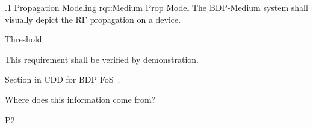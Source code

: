 \ONERQMTVKSA
{\RqtNumberBase.1}
{Propagation Modeling}
{rqt:Medium Prop Model}
{The BDP-Medium system shall visually depict the RF propagation on a device.}
{
	\item [Phase 1] Threshold
}
{This requirement shall be verified by demonstration.}
{
\item [5.5.19] Section in CDD for BDP FoS~\cite{ref__BDP_FOS_CDD}.
}
{
	\item Where does this information come from? \TBD
}
{P2}
